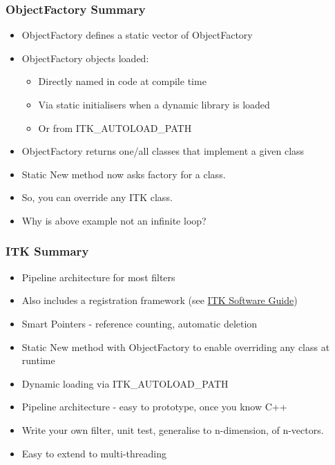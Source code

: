 \subsubsection{ObjectFactory Summary}\label{objectfactory-summary}

\begin{itemize}
\itemsep1pt\parskip0pt
\item
  ObjectFactory defines a static vector of ObjectFactory
\item
  ObjectFactory objects loaded:

  \begin{itemize}
  \itemsep1pt\parskip0pt
  \item
    Directly named in code at compile time
  \item
    Via static initialisers when a dynamic library is loaded
  \item
    Or from ITK\_AUTOLOAD\_PATH
  \end{itemize}
\item
  ObjectFactory returns one/all classes that implement a given class
\item
  Static New method now asks factory for a class.
\item
  So, you can override any ITK class.
\item
  Why is above example not an infinite loop?
\end{itemize}

\subsubsection{ITK Summary}\label{itk-summary}

\begin{itemize}
\itemsep1pt\parskip0pt
\item
  Pipeline architecture for most filters
\item
  Also includes a registration framework (see
  \href{http://www.itk.org/ItkSoftwareGuide.pdf}{ITK Software Guide})
\item
  Smart Pointers - reference counting, automatic deletion
\item
  Static New method with ObjectFactory to enable overriding any class at
  runtime
\item
  Dynamic loading via ITK\_AUTOLOAD\_PATH
\item
  Pipeline architecture - easy to prototype, once you know C++
\item
  Write your own filter, unit test, generalise to n-dimension, of
  n-vectors.
\item
  Easy to extend to multi-threading
\end{itemize}

